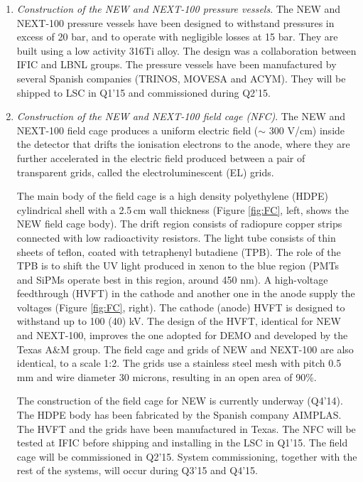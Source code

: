 \begin{enumerate}
\item {\em Construction of the NEW and NEXT-100 pressure vessels}.
The NEW and NEXT-100 pressure vessels have been designed to withstand pressures in excess of 20 bar, and to operate with negligible losses at 15 bar. They are built using a low activity 316Ti alloy. The design was a collaboration between IFIC and LBNL groups. The pressure vessels have been manufactured by several Spanish companies (TRINOS, MOVESA and ACYM). They will be shipped to LSC in Q1'15 and commissioned during Q2'15. 

\item {\em Construction of the NEW and NEXT-100 field cage (NFC)}.
The NEW and NEXT-100 field cage produces a uniform electric field ($\sim$ 300 V/cm) inside the  detector that drifts the ionisation electrons to the anode, where they are further accelerated in the electric field produced between a pair of transparent grids, called the electroluminescent (EL) grids. 

The main body of the field cage is a high density polyethylene (HDPE) cylindrical shell with a 2.5\,cm wall thickness (Figure \ref{fig:FC}, left, shows the NEW field cage body).  The drift region consists of radiopure  copper strips connected with low radioactivity resistors.  The light tube consists of thin sheets of teflon, coated with tetraphenyl butadiene (TPB). The role of the TPB is to shift the UV light produced in xenon to the blue region (PMTs and SiPMs operate best in this region, around 450 nm).  A high-voltage feedthrough (HVFT) in the cathode and another one in the anode supply the voltages (Figure \ref{fig:FC}, right). The cathode (anode) HVFT is designed to withstand up to 100 (40) kV. The design of the HVFT, identical for NEW and NEXT-100, improves the one adopted for DEMO and developed by the Texas A\&M group. The field cage and grids of NEW and NEXT-100 are also identical, to a scale 1:2. The grids use a stainless steel mesh with pitch 0.5 mm and wire diameter 30 microns, resulting in an open area of 90\%. 

The construction of the field cage for NEW is currently underway (Q4'14). The HDPE body has been fabricated by the Spanish company AIMPLAS. The HVFT and the grids have been manufactured in Texas. The NFC will be tested at IFIC before shipping and installing in the LSC in Q1'15. The field cage will be commissioned in Q2'15. System commissioning, together with the rest of the systems, will occur during Q3'15 and Q4'15.


\end{enumerate}
